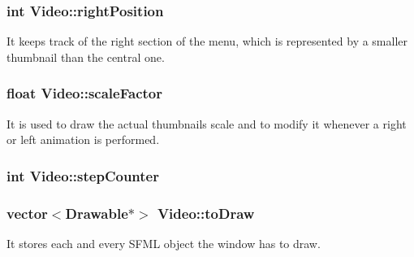 \subsubsection[{\texorpdfstring{right\+Position}{rightPosition}}]{\setlength{\rightskip}{0pt plus 5cm}int Video\+::right\+Position\hspace{0.3cm}{\ttfamily [private]}}\hypertarget{classVideo_a5edc214489dc7ffb30cbfe0849771537}{}\label{classVideo_a5edc214489dc7ffb30cbfe0849771537}
It keeps track of the right section of the menu, which is represented by a smaller thumbnail than the central one. 
\subsubsection[{\texorpdfstring{scale\+Factor}{scaleFactor}}]{\setlength{\rightskip}{0pt plus 5cm}float Video\+::scale\+Factor\hspace{0.3cm}{\ttfamily [private]}}\hypertarget{classVideo_a9437d769e28b21103b07da7092569e2e}{}\label{classVideo_a9437d769e28b21103b07da7092569e2e}
It is used to draw the actual thumbnail\textquotesingle{}s scale and to modify it whenever a right or left animation is performed. 
\subsubsection[{\texorpdfstring{step\+Counter}{stepCounter}}]{\setlength{\rightskip}{0pt plus 5cm}int Video\+::step\+Counter\hspace{0.3cm}{\ttfamily [private]}}\hypertarget{classVideo_a862be3ec8e981fe12e515c21e79f32c0}{}\label{classVideo_a862be3ec8e981fe12e515c21e79f32c0}
\subsubsection[{\texorpdfstring{to\+Draw}{toDraw}}]{\setlength{\rightskip}{0pt plus 5cm}vector$<$Drawable$\ast$$>$ Video\+::to\+Draw\hspace{0.3cm}{\ttfamily [private]}}\hypertarget{classVideo_a6b8b02006dbbe4a6cc2b469024c383a8}{}\label{classVideo_a6b8b02006dbbe4a6cc2b469024c383a8}
It stores each and every S\+F\+ML object the window has to draw. 
